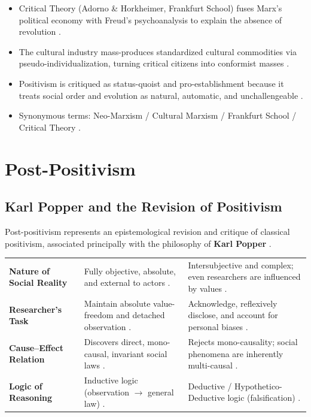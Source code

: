 \begin{QuickRevision}
\begin{itemize}
    \item Critical Theory (Adorno \& Horkheimer, Frankfurt School) fuses Marx's political economy with Freud's psychoanalysis to explain the absence of revolution .
    \item The cultural industry mass-produces standardized cultural commodities via pseudo-individualization, turning critical citizens into conformist masses .
    \item Positivism is critiqued as status-quoist and pro-establishment because it treats social order and evolution as natural, automatic, and unchallengeable .
    \item Synonymous terms: Neo-Marxism / Cultural Marxism / Frankfurt School / Critical Theory .
\end{itemize}
\end{QuickRevision}

\sectiondivider

\section{Post-Positivism}

\subsection{Karl Popper and the Revision of Positivism}
Post-positivism represents an epistemological revision and critique of classical positivism, associated principally with the philosophy of \textbf{Karl Popper} .

\vspace{6pt}
\noindent
\begin{tabularx}{\textwidth}{p{3.8cm} Y Y}
\toprule
{}
 &  &  \\
\midrule
\textbf{Nature of Social Reality} & Fully objective, absolute, and external to actors . & Intersubjective and complex; even researchers are influenced by values . \\
\textbf{Researcher's Task} & Maintain absolute value-freedom and detached observation . & Acknowledge, reflexively disclose, and account for personal biases . \\
\textbf{Cause--Effect Relation} & Discovers direct, mono-causal, invariant social laws . & Rejects mono-causality; social phenomena are inherently multi-causal . \\
\textbf{Logic of Reasoning} & Inductive logic (observation $\rightarrow$ general law) . & Deductive / Hypothetico-Deductive logic (falsification) . \\
\bottomrule
\end{tabularx}
\vspace{6pt}

